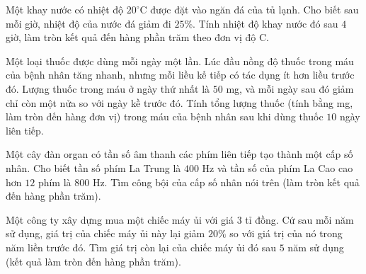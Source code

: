 \begin{ex}%
	Một khay nước có nhiệt độ $20^\circ$C được đặt vào ngăn đá của tủ lạnh. Cho biết sau mỗi giờ,  nhiệt độ của nước đá giảm đi $25$\%. Tính nhiệt độ khay nước đó sau $4$ giờ, làm tròn kết quả đến hàng phần trăm theo đơn vị độ C.
\end{ex}

\begin{ex}%
	Một loại thuốc được dùng mỗi ngày một lần. Lúc đầu nồng độ thuốc trong máu của bệnh nhân tăng nhanh, nhưng mỗi liều kế tiếp  có tác dụng ít hơn liều trước đó. Lượng thuốc trong máu ở ngày thứ nhất là $50$ mg, và mỗi ngày sau đó giảm chỉ còn một nửa so với ngày kề trước đó. Tính tổng lượng thuốc (tính bằng mg, làm tròn đến hàng đơn vị) trong máu của bệnh nhân sau khi dùng thuốc $10$ ngày liên tiếp.
\end{ex}

\begin{ex}%
	Một cây đàn organ có tần số âm thanh các phím liên tiếp tạo thành một cấp số nhân. Cho  biết tần số phím La Trung là $400$ Hz và tần số của phím La Cao cao hơn $12$ phím là $800$ Hz. Tìm công bội của cấp số nhân nói trên (làm tròn kết quả đến hàng phần trăm).
\end{ex}

\begin{ex}%
	Một công ty xây dựng mua một chiếc  máy ủi với giá $3$ tỉ đồng. Cứ sau mỗi năm sử dụng, giá trị của chiếc máy ủi này lại giảm $20\%$ so với giá trị của nó trong năm liền trước đó. Tìm giá trị còn lại của chiếc máy ủi đó sau $5$ năm sử dụng (kết quả làm tròn đến hàng phần trăm).
\end{ex}

